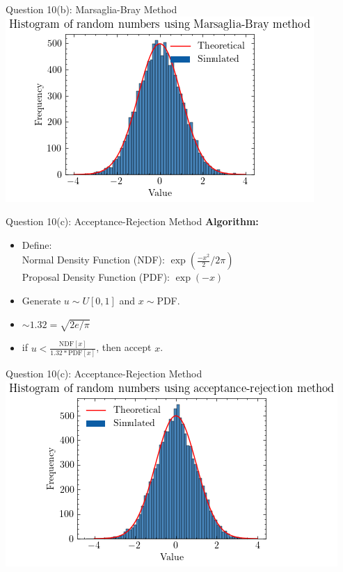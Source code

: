 \documentclass[compress,12pt]{beamer}
\begin{document}
\begin{frame}{Question 10(b): Marsaglia-Bray Method}
 \centering
 \includegraphics[scale=0.7]{imgs/marsagliabray.png}  \\
\end{frame}

\begin{frame}{Question 10(c): Acceptance-Rejection Method}
    \textbf{Algorithm:}
    \begin{itemize}
        \item Define:\\
        Normal Density Function (NDF): $\exp(\frac{-x^2}{2}/2\pi)$\\
        Proposal Density Function (PDF): $\exp(-x)$
        \item Generate $u\sim U[0,1]$ and $x\sim $PDF.
        \item $\sim 1.32 = \sqrt{2e/\pi}$
        \item if $u<\frac{\text{NDF}[x]}{1.32*\text{PDF}[x]}$, then accept $x$.
    \end{itemize}
\end{frame}

\begin{frame}{Question 10(c): Acceptance-Rejection Method}
 \centering
 \includegraphics[scale=0.7]{imgs/acceptancerejection.png}  \\
\end{frame}
\end{document}
